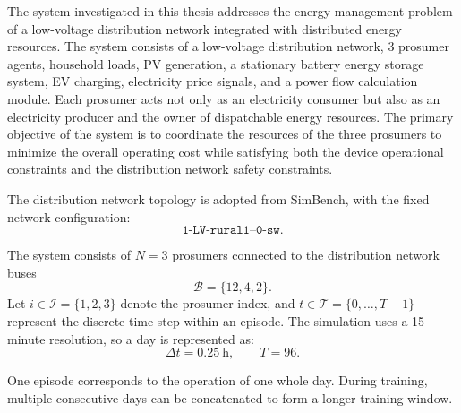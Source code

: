 The system investigated in this thesis addresses the energy management problem of a low-voltage distribution network integrated with distributed energy resources. The system consists of a low-voltage distribution network, 3 prosumer agents, household loads, PV generation, a stationary battery energy storage system, EV charging, electricity price signals, and a power flow calculation module. Each prosumer acts not only as an electricity consumer but also as an electricity producer and the owner of dispatchable energy resources. The primary objective of the system is to coordinate the resources of the three prosumers to minimize the overall operating cost while satisfying both the device operational constraints and the distribution network safety constraints.

The distribution network topology is adopted from SimBench, with the fixed network configuration:
\[
  \texttt{1-LV-rural1--0-sw}.
\]

The system consists of \(N=3\) prosumers connected to the distribution network buses
\[
  \mathcal{B} = \{12,4,2\}.
\]
Let \(i\in\mathcal{I}=\{1,2,3\}\) denote the prosumer index, and \(t\in\mathcal{T}=\{0,\ldots,T-1\}\) represent the discrete time step within an episode. The simulation uses a 15-minute resolution, so a day is represented as:
\[
  \Delta t = 0.25\ \mathrm{h}, \qquad T=96.
\]

One episode corresponds to the operation of one whole day. During training, multiple consecutive days can be concatenated to form a longer training window.

